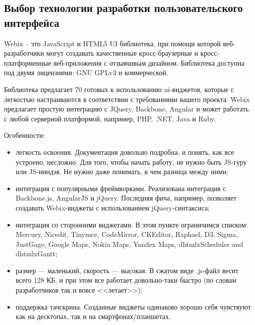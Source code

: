 \subsection{Выбор технологии разработки пользовательского интерфейса}
\label{sec:modeling:ui_technology}

Webix – это JavaScript и HTML5 UI библиотека, при помощи которой веб-разработчики могут создавать качественные кросс-браузерные и кросс-платформенные веб-приложения с отзывчивым дизайном. Библиотека доступна под двумя лицензиями: GNU GPLv3 и коммерческой.

Библиотека предлагает 70 готовых к использованию ui-виджетов, которые с легкостью настраиваются в соответствии с требованиями вашего проекта. Webix предлагает простую интеграцию с JQuery, Backbone, Angular и может работать с любой серверной платформой, например, PHP, .NET, Java и Ruby.

Особенности:

\begin{itemize}
    \item легкость освоения. Документация довольно подробна, и понять, как все устроено, несложно. Для того, чтобы начать работу, не нужно быть JS-гуру или JS-ниндзя. Не нужно даже понимать, в чем разница между ними;
    \item интеграция с популярными фреймворками. Реализована интеграция с Backbone.js, AngularJS и jQuery. Последняя фича, например, позволяет создавать Webix-виджеты с использованием jQuery-синтаксиса;
    \item интеграция со сторонними виджетами. В этом пункте ограничимся списком: Mercury, Nicedit, Tinymce, CodeMirror, CKEditor, Raphael, D3, Sigma, JustGage, Google Maps, Nokia Maps, Yandex Maps, dhtmlxScheduler and dhtmlxGantt;
    \item размер — маленький, скорость — высокая. В сжатом виде .js-файл весит всего 128 КБ, и при этом все работает довольно-таки быстро (по словам разработчиков так и вовсе <<летает>>);
    \item поддержка тачскрина. Созданные виджеты одинаково хорошо себя чувствуют как на десктопах, так и на смартфонах/планшетах.
\end{itemize}

